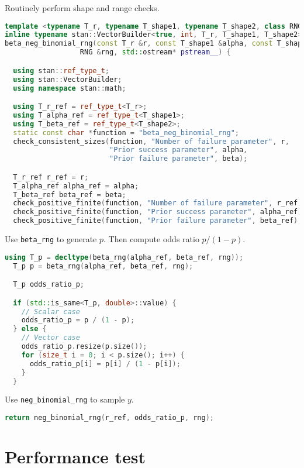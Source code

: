 \documentclass[11pt]{article}
\begin{document}
Routinely perform shape and range checks.
\begin{lstlisting}[language=c++, style=lgeneral]
template <typename T_r, typename T_shape1, typename T_shape2, class RNG>
inline typename stan::VectorBuilder<true, int, T_r, T_shape1, T_shape2>::type
beta_neg_binomial_rng(const T_r &r, const T_shape1 &alpha, const T_shape2 &beta,
                  RNG &rng, std::ostream* pstream__) {

  using stan::ref_type_t;
  using stan::VectorBuilder;
  using namespace stan::math;

  using T_r_ref = ref_type_t<T_r>;
  using T_alpha_ref = ref_type_t<T_shape1>;
  using T_beta_ref = ref_type_t<T_shape2>;
  static const char *function = "beta_neg_binomial_rng";
  check_consistent_sizes(function, "Number of failure parameter", r,
                         "Prior success parameter", alpha,
                         "Prior failure parameter", beta);

  T_r_ref r_ref = r;
  T_alpha_ref alpha_ref = alpha;
  T_beta_ref beta_ref = beta;
  check_positive_finite(function, "Number of failure parameter", r_ref);
  check_positive_finite(function, "Prior success parameter", alpha_ref);
  check_positive_finite(function, "Prior failure parameter", beta_ref);

\end{lstlisting}


Use \verb|beta_rng| to generate $p$. Then compute odds ratio $p/(1-p)$.
\begin{lstlisting}[language=c++, style=lgeneral]
  using T_p = decltype(beta_rng(alpha_ref, beta_ref, rng));
  T_p p = beta_rng(alpha_ref, beta_ref, rng);

  T_p odds_ratio_p;

  if (std::is_same<T_p, double>::value) {
    // Scalar case
    odds_ratio_p = p / (1 - p);
  } else {
    // Vector case
    odds_ratio_p.resize(p.size());
    for (size_t i = 0; i < p.size(); i++) {
      odds_ratio_p[i] = p[i] / (1 - p[i]);
    }
  }
\end{lstlisting}

Use \verb|neg_binomial_rng| to sample $y$.
\begin{lstlisting}[language=c++, style=lgeneral]
	return neg_binomial_rng(r_ref, odds_ratio_p, rng);
\end{lstlisting}








\section{Performance test}
\end{document}
